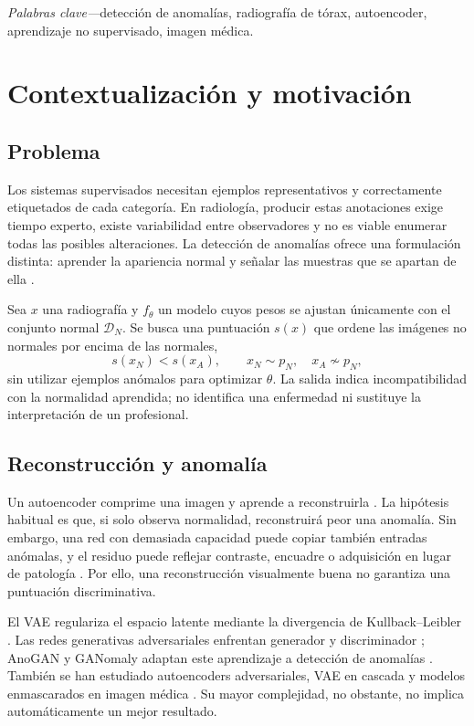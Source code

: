 \documentclass[10pt,a4paper,twocolumn]{article}
\begin{document}
\smallskip
\noindent\textit{Palabras clave---}detección de anomalías, radiografía
de tórax, autoencoder, aprendizaje no supervisado, imagen médica.
\endgroup

\section{Contextualización y motivación}

\subsection{Problema}

Los sistemas supervisados necesitan ejemplos representativos y correctamente
etiquetados de cada categoría. En radiología, producir estas anotaciones exige
tiempo experto, existe variabilidad entre observadores y no es viable enumerar
todas las posibles alteraciones. La detección de anomalías ofrece una
formulación distinta: aprender la apariencia normal y señalar las muestras que
se apartan de ella \cite{pang2021review,ruff2021unifying}.

Sea $x$ una radiografía y $f_\theta$ un modelo cuyos pesos se ajustan únicamente
con el conjunto normal $\mathcal D_N$. Se busca una puntuación $s(x)$ que ordene
las imágenes no normales por encima de las normales,
\[
  s(x_N)<s(x_A),\qquad x_N\sim p_N,\quad x_A\not\sim p_N,
\]
sin utilizar ejemplos anómalos para optimizar $\theta$. La salida indica
incompatibilidad con la normalidad aprendida; no identifica una enfermedad ni
sustituye la interpretación de un profesional.

\subsection{Reconstrucción y anomalía}

Un autoencoder comprime una imagen y aprende a reconstruirla
\cite{hinton2006reducing}. La hipótesis habitual es que, si solo observa
normalidad, reconstruirá peor una anomalía. Sin embargo, una red con demasiada
capacidad puede copiar también entradas anómalas, y el residuo puede reflejar
contraste, encuadre o adquisición en lugar de patología
\cite{baur2021autoencoders}. Por ello, una reconstrucción visualmente buena no
garantiza una puntuación discriminativa.

El VAE regulariza el espacio latente mediante la divergencia de
Kullback--Leibler \cite{kingma2014vae}. Las redes generativas adversariales
enfrentan generador y discriminador \cite{goodfellow2014gan}; AnoGAN y GANomaly
adaptan este aprendizaje a detección de anomalías
\cite{schlegl2017anogan,akcay2019ganomaly}. También se han estudiado
autoencoders adversariales, VAE en cascada y modelos enmascarados en imagen
médica \cite{zhang2022improved,guo2021cvad,georgescu2023masked,he2022mae}. Su mayor
complejidad, no obstante, no implica automáticamente un mejor resultado.
\end{document}
